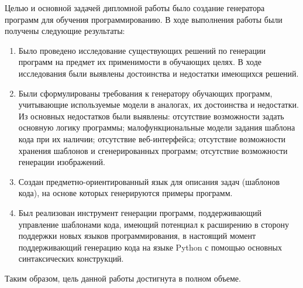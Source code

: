 
Целью и основной задачей дипломной работы было создание генератора программ для обучения
программированию. В ходе выполнения работы были получены следующие результаты:

\begin{enumerate}
    \item Было проведено исследование существующих решений по генерации программ на
          предмет их применимости в обучающих целях. В ходе исследования были выявлены достоинства и
          недостатки имеющихся решений.
    \item Были сформулированы требования к генератору обучающих программ, учитывающие используемые
          модели в аналогах, их достоинства и недостатки. Из основных недостатков были выявлены: отсутствие возможности
          задать основную логику программы; малофункциональные модели задания шаблона кода при их
          наличии; отсутствие веб-интерфейса; отсутствие возможности хранения шаблонов и
          сгенерированных программ; отсутствие возможности генерации изображений.
    \item Создан предметно-ориентированный язык для описания задач (шаблонов кода), на основе которых генерируются примеры программ.
    \item Был реализован инструмент генерации программ, поддерживающий управление
          шаблонами кода, имеющий потенциал к расширению в сторону поддержки новых языков
          программирования, в настоящий момент поддерживающий генерацию кода на языке Python
          с помощью основных синтаксических конструкций.
\end{enumerate}

Таким образом, цель данной работы достигнута в полном объеме.